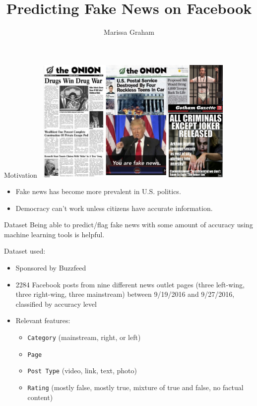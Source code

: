 \documentclass[xcolor=dvipsnames, 14pt]{beamer}
\title[]{Predicting Fake News on Facebook}
\author[Marissa Graham]{Marissa Graham}
\institute{CS 401R Final Project}
\date{}
\begin{document}
\frame{\titlepage}

\begin{frame}{Motivation}
\centering
\includegraphics[width=10cm,height=6cm]{fake_news_collage.png}

\footnotesize
\begin{itemize}
\item Fake news has become more prevalent in U.S. politics.
\item Democracy can't work unless citizens have accurate information.
\end{itemize}
\end{frame}

\begin{frame}{Dataset}
\vspace{0.5cm}
\small
Being able to predict/flag fake news with some amount of accuracy using machine learning tools is helpful.
\vspace{0.25cm}

Dataset used:
\small
\begin{itemize}
\item Sponsored by Buzzfeed
\item 2284 Facebook posts from nine different news outlet pages (three left-wing, three right-wing, three mainstream) between 9/19/2016 and 9/27/2016, classified by accuracy level
\item Relevant features: 
\begin{itemize}
\footnotesize
\item \texttt{Category} (mainstream, right, or left)
\item \texttt{Page}
\item \texttt{Post Type} (video, link, text, photo)
\item \texttt{Rating} (mostly false, mostly true, mixture of true and false, no factual content)
\end{itemize}
\end{itemize}

\end{frame}
\end{document}
